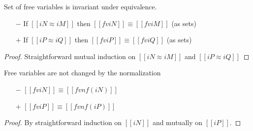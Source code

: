 \begin{lemma}
  \label{lemma:equiv-fv}
  Set of free variables is invariant under equivalence.
  \begin{itemize}
  \item[$-$] If $[[iN ≈ iM]]$ then $[[fv iN]] \equiv [[fv iM]]$ (as sets)
  \item[$+$] If $[[iP ≈ iQ]]$ then $[[fv iP]] \equiv [[fv iQ]]$ (as sets)
  \end{itemize}
\end{lemma}
\begin{proof}
  Straightforward mutual induction on $[[iN ≈ iM]]$ and $[[iP ≈ iQ]]$
\end{proof}


\begin{lemma}
  \label{lemma:fv-nf}
  Free variables are not changed by the normalization
  \begin{itemize}
  \item[$-$] $[[fv iN]] \equiv [[fv nf(iN)]]$
  \item[$+$] $[[fv iP]] \equiv [[fv nf(iP)]]$
  \end{itemize}
\end{lemma}
\begin{proof}
  By straightforward induction on $[[iN]]$ and mutually on $[[iP]]$.
\end{proof}


